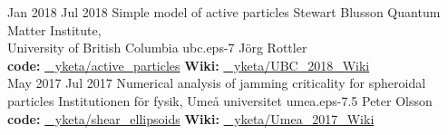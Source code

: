 \documentclass[letterpaper]{cvtemplate_en} %
\begin{document}
\begin{cvbody}
\cvitem
	{Jan 2018}
	{Jul 2018}
  {Simple model of active particles}
  {Stewart Blusson Quantum Matter Institute,\\ University of British Columbia }
  {ubc.eps}{}{-7}
  {J\"org Rottler}
  {\\
  {\bf code:} \href{https://github.com/yketa/active_particles}{\faGithub~ yketa/active\_particles} \hfill {\bf Wiki:} \href{https://yketa.github.io/UBC_2018_Wiki}{\faGithub~ yketa/UBC\_2018\_Wiki}
  }
  \\

\cvitem
	{May 2017}
	{Jul 2017}
	{Numerical analysis of jamming criticality for spheroidal particles}
	{Institutionen f\"{o}r fysik, Ume\r{a} universitet }
	{umea.eps}{}{-7.5}
	{Peter Olsson}
	{\\
	{\bf code:} \href{https://github.com/yketa/shear_ellipsoids}{\faGithub~ yketa/shear\_ellipsoids} \hfill {\bf Wiki:} \href{https://yketa.github.io/Umea_2017_Wiki}{\faGithub~ yketa/Umea\_2017\_Wiki}
	}
  \\


\end{cvbody}
\end{document}
